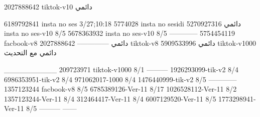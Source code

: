 2027888642 tiktok-v10
دائمي

6189792841 insta no ses
3/27;10:18
5774028 insta no sesidi
دائمي
5270927316 insta no ses-v10
8/5
5678363932 insta no ses-v10
8/5
------------
5754454119 facbook-v8
دائمي
--------------
2027888642 tiktok-v8
دائمي
5909533996 tiktok-v1000
دائمي مع التحديث

__________
209723971 tiktok-v1000
8/1
---------
1926293099-tik-v2
8/4
6986353951-tik-v2
8/4
971062017-1000
8/4
1476440999-tik-v2
8/5
------------
1357123244 facbook-v8
8/5
6785389126-Ver-11
8/17
1026528112-Ver-11
8/2
1357123244-Ver-11
8/4
312464417-Ver-11
8/4
6007129520-Ver-11
8/5
1773298941-Ver-11
8/5
---------
------
